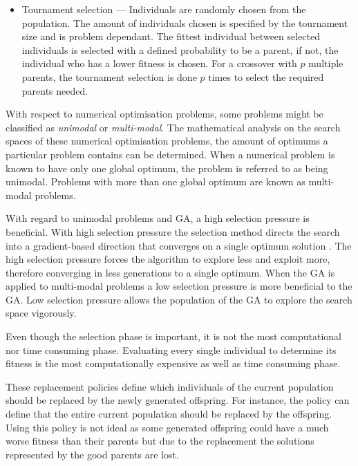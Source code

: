 \begin{itemize}
    \item{Tournament selection} --- Individuals are randomly chosen from the population. The amount of individuals chosen is specified by the tournament size and is problem dependant. The fittest individual between selected individuals is selected with a defined probability to be a parent, if not, the individual who has a lower fitness is chosen\cite{IntroToGAs}. For a crossover with $p$ multiple parents, the tournament selection is done $p$ times to select the required parents needed\cite{CompuIntelligenceIntro}.
\end{itemize}

With respect to numerical optimisation problems, some problems might be classified as \emph{unimodal} or \emph{multi-modal}\cite{FirstMathModel, CompuIntelligenceIntro}. The mathematical analysis on the search spaces of these numerical optimisation problems, the amount of optimums a particular problem contains can be determined\cite{FirstMathModel, CompuIntelligenceIntro}. When a numerical problem is known to have only one global optimum, the problem is referred to as being unimodal\cite{FirstMathModel, CompuIntelligenceIntro}. Problems with more than one global optimum are known as multi-modal problems\cite{FirstMathModel, CompuIntelligenceIntro}.

With regard to unimodal problems and \gls{GA}, a high selection pressure is beneficial\cite{ConstrainedGA}. With high selection pressure the selection method directs the search into a gradient-based direction that converges on a single optimum solution \cite{ConstrainedGA}. The high selection pressure forces the algorithm to explore less and exploit more, therefore converging in less generations to a single optimum. When the \gls{GA} is applied to multi-modal problems a low selection pressure is more beneficial to the \gls{GA}\cite{ConstrainedGA}. Low selection pressure allows the population of the \gls{GA} to explore the search space vigorously\cite{ConstrainedGA}.

Even though the selection phase is important, it is not the most computational nor time consuming phase. Evaluating every single individual to determine its fitness is the most computationally expensive as well as time consuming phase\cite{AcceleratingGA}. 

These replacement policies define which individuals of the current population should be replaced by the newly generated offspring\cite{CompuIntelligenceIntro}. For instance, the policy can define that the entire current population should be replaced by the offspring\cite{CompuIntelligenceIntro}. Using this policy is not ideal as some generated offspring could have a much worse fitness than their parents but due to the replacement the solutions represented by the good parents are lost\cite{CompuIntelligenceIntro}. 

